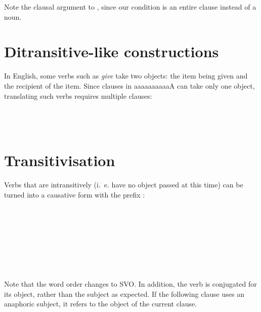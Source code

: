 \documentclass{book}
\newcommand{\lname}{aaaaaaaaaaA}
\begin{document}
Note the clausal argument to , since our condition is an entire clause instead of a noun.

\section{Ditransitive-like constructions}

In English, some verbs such as \emph{give} take two objects: the item being given and the recipient of the item. Since clauses in \lname{} can take only one object, translating such verbs requires multiple clauses: \\
~\\
 \\
     \\
   

\section{Transitivisation}

Verbs that are intransitively (i.~e. have no object passed at this time) can be turned into a causative form with the prefix : \\
~\\
 \\
  \\
  \\
~\\
 \\
   \\
   \\

Note that the word order changes to SVO. In addition, the verb is conjugated for its object, rather than the subject as expected. If the following clause uses an anaphoric subject, it refers to the object of the current clause.
\end{document}

